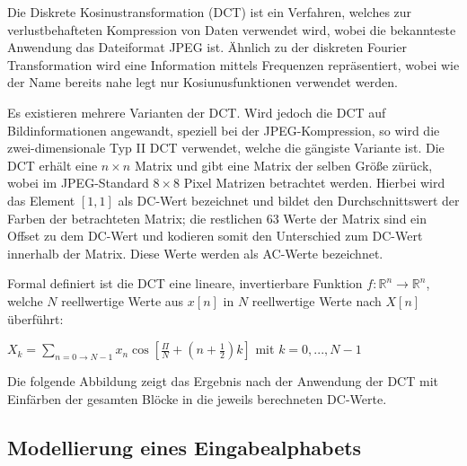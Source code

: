 Die Diskrete Kosinustransformation (DCT)\cite{Khayam03thediscrete} ist ein Verfahren, welches zur verlustbehafteten Kompression von Daten verwendet wird, wobei die bekannteste Anwendung das Dateiformat JPEG ist.
 Ähnlich zu der diskreten Fourier Transformation wird eine Information mittels Frequenzen repräsentiert, wobei wie der Name bereits nahe legt nur Kosiunusfunktionen verwendet werden.


Es existieren mehrere Varianten der DCT.
Wird jedoch die DCT auf Bildinformationen angewandt, speziell bei der JPEG-Kompression, so wird die zwei-dimensionale Typ II DCT verwendet, welche die gängiste Variante ist.
Die DCT erhält eine $n \times  n$ Matrix und gibt eine Matrix der selben Größe zürück, wobei im JPEG-Standard $8 \times 8$ Pixel Matrizen betrachtet werden.
Hierbei wird das Element $[1,1]$ als DC-Wert bezeichnet und bildet den Durchschnittswert der Farben der betrachteten Matrix; die restlichen 63 Werte der Matrix sind ein Offset zu dem DC-Wert und kodieren somit den Unterschied zum DC-Wert innerhalb der Matrix.
Diese Werte werden als AC-Werte bezeichnet.


Formal definiert ist die DCT eine lineare, invertierbare Funktion $f : \mathbb{R}^n \rightarrow \mathbb{R}^n$, welche $N$ reellwertige Werte aus $x[n]$ in $N$ reellwertige Werte nach $X[n]$ überführt:

 $X_k = \sum\limits_{n=0\rightarrow N-1} x_n \cos [\frac{\Pi}{N} + (n + \frac{1}{2}) k ]$ mit $k = 0,..., N-1$


Die folgende Abbildung zeigt das Ergebnis nach der Anwendung der DCT mit Einfärben der gesamten Blöcke in die jeweils berechneten DC-Werte.


\subsection{Modellierung eines Eingabealphabets}
\label{sec:modellierungeingabealphabet}

